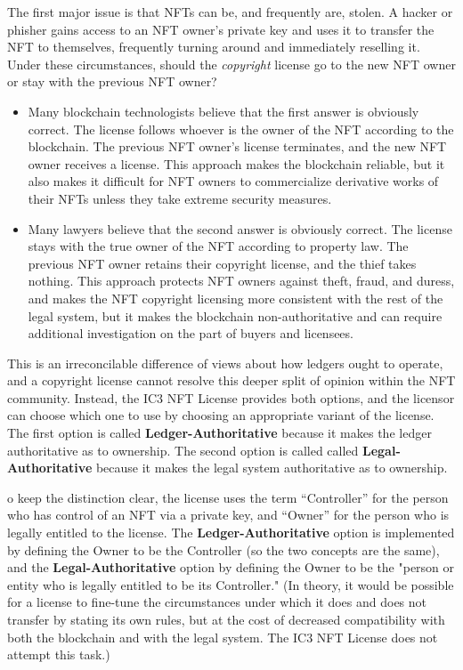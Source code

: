 \documentclass{article}
\newcommand{\iccclicense}{IC3 NFT License\xspace}
\newcommand{\keyword}[1]{\textbf{#1}\xspace}
\newcommand{\ledger}{\keyword{Ledger-Authoritative}}
\newcommand{\legal}{\keyword{Legal-Authoritative}}
\begin{document}
The first major issue is that NFTs can be, and frequently are, stolen. A hacker or phisher gains access to an NFT owner's private key and uses it to transfer the NFT to themselves, frequently turning around and immediately reselling it. Under these circumstances, should the \emph{copyright} license go to the new NFT owner or stay with the previous NFT owner?
\begin{itemize}
\item Many blockchain technologists believe that the first answer is obviously correct. The license follows whoever is the owner of the NFT according to the blockchain. The previous NFT owner's license terminates, and the new NFT owner receives a license. This approach makes the blockchain reliable, but it also makes it difficult for NFT owners to commercialize derivative works of their NFTs unless they take extreme security measures.
\item Many lawyers believe that the second answer is obviously correct. The license stays with the true owner of the NFT according to property law. The previous NFT owner retains their copyright license, and the thief takes nothing. This approach protects NFT owners against theft, fraud, and duress, and makes the NFT copyright licensing more consistent with the rest of the legal system, but it makes the blockchain non-authoritative and can require additional investigation on the part of buyers and licensees.
\end{itemize}
This is an irreconcilable difference of views about how ledgers ought to operate, and a copyright license cannot resolve this deeper split of opinion within the NFT community. Instead, the \iccclicense provides both options, and the licensor can choose which one to use by choosing an appropriate variant of the license. The first option is called \ledger because it makes the ledger authoritative as to ownership. The second option is called called \legal because it makes the legal system authoritative as to ownership.
 
 o keep the distinction clear, the license uses the term ``Controller'' for the person who has control of an NFT via a private key, and ``Owner'' for the person who is legally entitled to the license. The \ledger option is implemented by defining the Owner to be the Controller (so the two concepts are the same), and the \legal option by defining the Owner to be the "person or entity who is legally entitled to be its Controller." (In theory, it would be possible for a license to fine-tune the circumstances under which it does and does not transfer by stating its own rules, but at the cost of decreased compatibility with both the blockchain and with the legal system. The \iccclicense does not attempt this task.)
\end{document}
